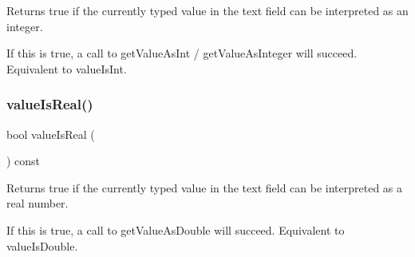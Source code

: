 Returns true if the currently typed value in the text field can be interpreted as an integer. 

If this is true, a call to get\+Value\+As\+Int / get\+Value\+As\+Integer will succeed. Equivalent to value\+Is\+Int. \mbox{\label{classGTextField_a29a5f540431d7993ff00eee5d2584a36}} 
\subsubsection{\texorpdfstring{value\+Is\+Real()}{valueIsReal()}}
{\footnotesize\ttfamily bool value\+Is\+Real (\begin{DoxyParamCaption}{ }\end{DoxyParamCaption}) const\hspace{0.3cm}{\ttfamily [virtual]}}



Returns true if the currently typed value in the text field can be interpreted as a real number. 

If this is true, a call to get\+Value\+As\+Double will succeed. Equivalent to value\+Is\+Double. 